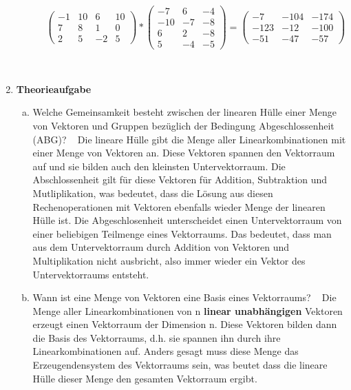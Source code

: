 \documentclass[10pt,ngerman]{scrartcl}
\begin{document}
\begin{enumerate}[1.]
\begin{enumerate}[(a)]
	\newline~\newline~\newline
	\begin{math}
	\begin{pmatrix}-1 & 10 & 6 & 10 \\ 7 & 8 & 1 & 0 \\ 2 & 5 & -2 & 5 \end{pmatrix} * 
	\begin{pmatrix}-7 & 6 & -4 \\ -10 & -7 & -8 \\ 6 & 2 & -8 \\ 5 & -4 & -5\end{pmatrix} = 
	\begin{pmatrix}-7 & -104 & -174 \\ -123 & -12 & -100 \\ -51 & -47 & -57\end{pmatrix}
	\end{math}
	\end{enumerate}
	~\newline~\newline
	
	
	\item \textbf{Theorieaufgabe}
	\newline
	\begin{enumerate}[(a)]
	    \item Welche Gemeinsamkeit besteht zwischen der linearen Hülle einer Menge von Vektoren und Gruppen bezüglich der Bedingung Abgeschlossenheit (ABG)? \newline
	    ~\newline
	    Die lineare Hülle gibt die Menge aller Linearkombinationen mit einer Menge von Vektoren an. Diese Vektoren spannen den Vektorraum auf und sie bilden auch den kleinsten Untervektorraum. Die Abschlossenheit gilt für diese Vektoren für Addition, Subtraktion und Mutliplikation, was bedeutet, dass die Lösung aus diesen Rechenoperationen mit Vektoren ebenfalls wieder Menge der linearen Hülle ist.\newline
	    Die Abgeschlosenheit  unterscheidet einen Untervektorraum  von einer beliebigen Teilmenge eines Vektorraums. Das bedeutet, dass man aus dem Untervektorraum durch Addition von Vektoren und Multiplikation nicht ausbricht, also immer wieder ein Vektor des Untervektorraums entsteht.\newline
	    ~\newline
	    \item Wann ist eine Menge von Vektoren eine Basis eines Vektorraums?\newline
	    ~\newline
	    Die Menge aller Linearkombinationen von n \textbf{linear unabhängigen} Vektoren erzeugt einen Vektorraum der Dimension n. Diese Vektoren bilden dann die Basis des Vektorraums, d.h. sie spannen ihn durch ihre Linearkombinationen auf. Anders gesagt muss diese Menge das Erzeugendensystem des Vektorraums sein, was beutet dass die lineare Hülle dieser Menge den gesamten Vektorraum ergibt. 
	\end{enumerate}
	

\end{enumerate}

\vfill
\end{document}
